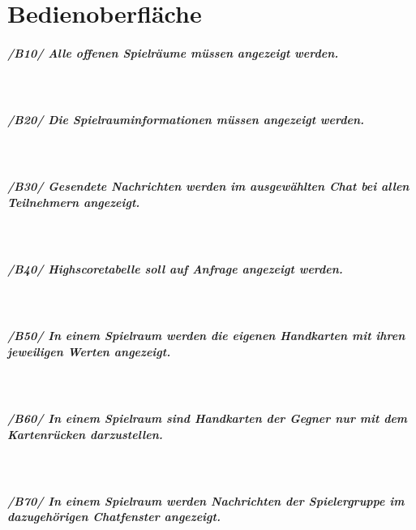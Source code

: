 
\chapter{Bedienoberfläche}

	\paragraph{/B10/ Alle offenen Spielräume müssen angezeigt werden.}\hspace{1mm}\\
	\paragraph{/B20/ Die Spielrauminformationen müssen angezeigt werden.}\hspace{1mm}\\
	\paragraph{/B30/ Gesendete Nachrichten werden im ausgewählten Chat bei allen Teilnehmern angezeigt.}\hspace{1mm}\\
	\paragraph{/B40/ Highscoretabelle soll auf Anfrage angezeigt werden.}\hspace{1mm}\\
	\paragraph{/B50/ In einem Spielraum werden die eigenen Handkarten mit ihren jeweiligen Werten angezeigt.}\hspace{1mm}\\
	\paragraph{/B60/ In einem Spielraum sind Handkarten der Gegner nur mit dem Kartenrücken darzustellen.}\hspace{1mm}\\
	\paragraph{/B70/ In einem Spielraum werden Nachrichten der Spielergruppe im dazugehörigen Chatfenster angezeigt.}\hspace{1mm}\\
